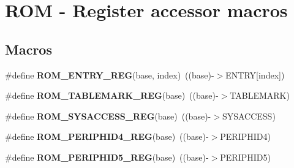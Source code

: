 \hypertarget{group___r_o_m___register___accessor___macros}{}\section{R\+OM -\/ Register accessor macros}
\label{group___r_o_m___register___accessor___macros}
\subsection*{Macros}
\begin{DoxyCompactItemize}
\item 
\mbox{\label{group___r_o_m___register___accessor___macros_gab4e97748d1b7d5e8024f502e628709fa}} 
\#define {\bfseries R\+O\+M\+\_\+\+E\+N\+T\+R\+Y\+\_\+\+R\+EG}(base,  index)~((base)-\/$>$E\+N\+T\+RY\mbox{[}index\mbox{]})
\item 
\mbox{\label{group___r_o_m___register___accessor___macros_gaf92010f49e8870d94588098c5f7b42d7}} 
\#define {\bfseries R\+O\+M\+\_\+\+T\+A\+B\+L\+E\+M\+A\+R\+K\+\_\+\+R\+EG}(base)~((base)-\/$>$T\+A\+B\+L\+E\+M\+A\+RK)
\item 
\mbox{\label{group___r_o_m___register___accessor___macros_ga7dc11ad9e3be5913bed30c8a8749eaa8}} 
\#define {\bfseries R\+O\+M\+\_\+\+S\+Y\+S\+A\+C\+C\+E\+S\+S\+\_\+\+R\+EG}(base)~((base)-\/$>$S\+Y\+S\+A\+C\+C\+E\+SS)
\item 
\mbox{\label{group___r_o_m___register___accessor___macros_ga41943ddb688f579c57887a4abe9df501}} 
\#define {\bfseries R\+O\+M\+\_\+\+P\+E\+R\+I\+P\+H\+I\+D4\+\_\+\+R\+EG}(base)~((base)-\/$>$P\+E\+R\+I\+P\+H\+I\+D4)
\item 
\mbox{\label{group___r_o_m___register___accessor___macros_gadd1423bc7a8ebde255e7c2d422096bf0}} 
\#define {\bfseries R\+O\+M\+\_\+\+P\+E\+R\+I\+P\+H\+I\+D5\+\_\+\+R\+EG}(base)~((base)-\/$>$P\+E\+R\+I\+P\+H\+I\+D5)
\item 
\mbox{\label{group___r_o_m___register___accessor___macros_ga172a468c57c46e3edf4f67910f6e8b0c}} 

\end{DoxyCompactItemize}
